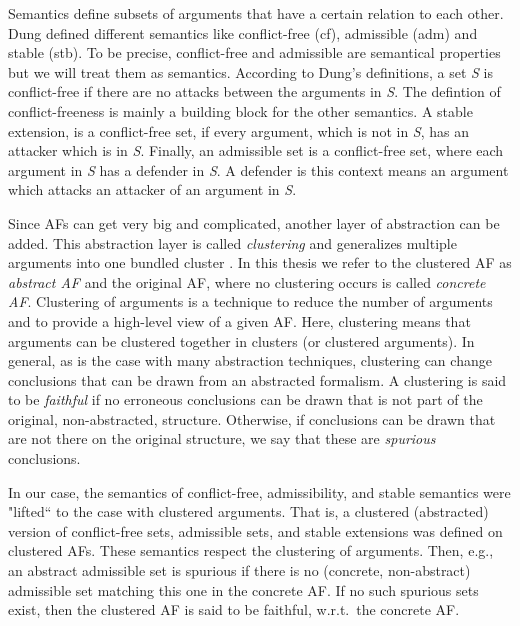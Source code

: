 Semantics define subsets of arguments that have a certain relation to each other. Dung defined different semantics \cite{Dung1995-DUNOTA-2} like conflict-free (cf), admissible (adm) and stable (stb). To be precise, conflict-free and admissible are semantical properties but we will treat them as semantics. According to Dung's definitions, a set \textit{S} is conflict-free if there are no attacks between the arguments in \textit{S}. The defintion of conflict-freeness is mainly a building block for the other semantics.
A stable extension, is a conflict-free set, if every argument, which is not in \textit{S}, has an attacker which is in \textit{S}.
Finally, an admissible set is a conflict-free set, where each argument in \textit{S} has a defender in \textit{S}. A defender is this context means an argument which attacks an attacker of an argument in \textit{S}.


Since AFs can get very big and complicated, another layer of abstraction can be added. This abstraction layer is called \emph{clustering} and generalizes multiple arguments into one bundled cluster \cite{DBLP:conf/kr/SaribaturW21}. In this thesis we refer to the clustered AF as \emph{abstract AF} and the original AF, where no clustering occurs is called \emph{concrete AF}.
Clustering of arguments is a technique to reduce the number of arguments and to provide a high-level view of a given AF. Here, clustering means that arguments can be clustered together in clusters (or clustered arguments). In general, as is the case with many abstraction techniques, clustering can change conclusions that can be drawn from an abstracted formalism. A clustering is said to be \emph{faithful} if no erroneous conclusions can be drawn that is not part of the original, non-abstracted, structure. Otherwise, if conclusions can be drawn that are not there on the original structure, we say that these are \emph{spurious} conclusions.

In our case, the semantics of conflict-free, admissibility, and stable semantics were "lifted`` to the case with clustered arguments. That is, a clustered (abstracted) version of conflict-free sets, admissible sets, and stable extensions was defined on clustered AFs. These semantics respect the clustering of arguments. Then, e.g., an abstract admissible set is spurious if there is no (concrete, non-abstract) admissible set matching this one in the concrete AF. If no such spurious sets exist, then the clustered AF is said to be faithful, w.r.t.\ the concrete AF.






